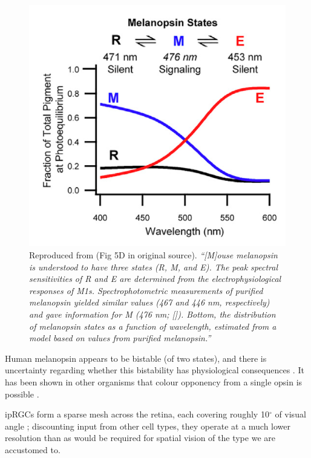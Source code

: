\begin{figure}[htbp]
\includegraphics[max width=\textwidth, center]{figs/LitRev/melstates.png}
\caption{Reproduced from \citet{do_melanopsin_2019} (Fig 5D in original source). \textit{``[M]ouse melanopsin is understood to have three states (R, M, and E). The peak spectral sensitivities of R and E are determined from the electrophysiological responses of M1s. Spectrophotometric measurements of purified melanopsin yielded similar values (467 and 446 nm, respectively) and gave information for M (476 nm; [\citet{matsuyama_photochemical_2012-1}]). Bottom, the distribution of melanopsin states as a function of wavelength, estimated from a model based on values from purified melanopsin.''}}
\label{fig:melssf}
\end{figure}

Human melanopsin appears to be bistable (of two states), and there is uncertainty regarding whether this bistability has physiological consequences \citep{cie_cie_2015-1,mure_melanopsin_2009,rollag_does_2008,wada_color_2018,mure_melanopsin-dependent_2007,mawad_absence_2008,koyanagi_cephalochordate_2005,emanuel_melanopsin_2015}. It has been shown in other organisms that colour opponency from a single opsin is possible \citep{wada_color_2018}.

\Glspl{ipRGC} form a sparse mesh across the retina, each covering roughly 10$^{\circ}$ of visual angle \citep{ecker_melanopsin-expressing_2010}; discounting input from other cell types, they operate at a much lower resolution than as would be required for spatial vision of the type we are accustomed to. 

